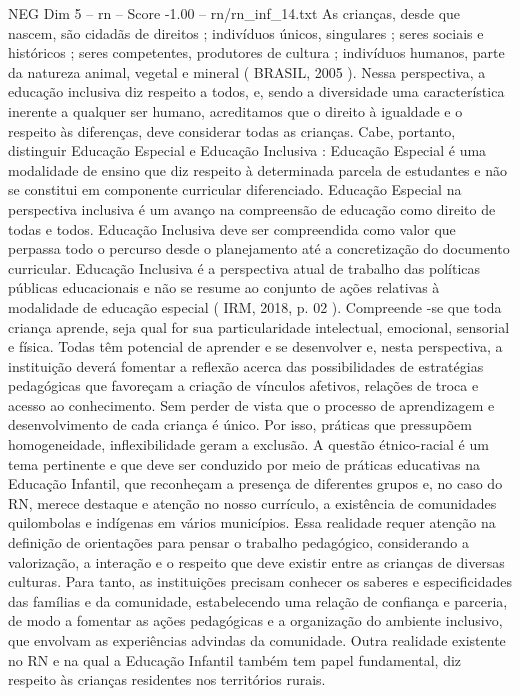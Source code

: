 \begin{textsample}{NEG Dim 5 – rn – Score -1.00 – rn/rn\_inf\_14.txt}
As crianças, desde que nascem, são cidadãs de direitos ; indivíduos únicos, singulares ; seres sociais e históricos ; seres competentes, produtores de cultura ; indivíduos humanos, parte da natureza animal, vegetal e mineral ( BRASIL, 2005 ).
Nessa perspectiva, a educação inclusiva diz respeito a todos, e, sendo a diversidade uma característica inerente a qualquer ser humano, acreditamos que o direito à igualdade e o respeito às diferenças, deve considerar todas as crianças.
Cabe, portanto, distinguir Educação Especial e Educação Inclusiva : Educação Especial é uma modalidade de ensino que diz respeito à determinada parcela de estudantes e não se constitui em componente curricular diferenciado.
Educação Especial na perspectiva inclusiva é um avanço na compreensão de educação como direito de todas e todos.
Educação Inclusiva deve ser compreendida como valor que perpassa todo o percurso desde o planejamento até a concretização do documento curricular.
Educação Inclusiva é a perspectiva atual de trabalho das políticas públicas educacionais e não se resume ao conjunto de ações relativas à modalidade de educação especial ( IRM, 2018, p. 02 ).
Compreende -se que toda criança aprende, seja qual for sua particularidade intelectual, emocional, sensorial e física.
Todas têm potencial de aprender e se desenvolver e, nesta perspectiva, a instituição deverá fomentar a reflexão acerca das possibilidades de estratégias pedagógicas que favoreçam a criação de vínculos afetivos, relações de troca e acesso ao conhecimento.
Sem perder de vista que o processo de aprendizagem e desenvolvimento de cada criança é único.
Por isso, práticas que pressupõem homogeneidade, inflexibilidade geram a exclusão.
A questão étnico-racial é um tema pertinente e que deve ser conduzido por meio de práticas educativas na Educação Infantil, que reconheçam a presença de diferentes grupos e, no caso do RN, merece destaque e atenção no nosso currículo, a existência de comunidades quilombolas e indígenas em vários municípios.
Essa realidade requer atenção na definição de orientações para pensar o trabalho pedagógico, considerando a valorização, a interação e o respeito que deve existir entre as crianças de diversas culturas.
Para tanto, as instituições precisam conhecer os saberes e especificidades das famílias e da comunidade, estabelecendo uma relação de confiança e parceria, de modo a fomentar as ações pedagógicas e a organização do ambiente inclusivo, que envolvam as experiências advindas da comunidade.
Outra realidade existente no RN e na qual a Educação Infantil também tem papel fundamental, diz respeito às crianças residentes nos territórios rurais.

\end{textsample}
